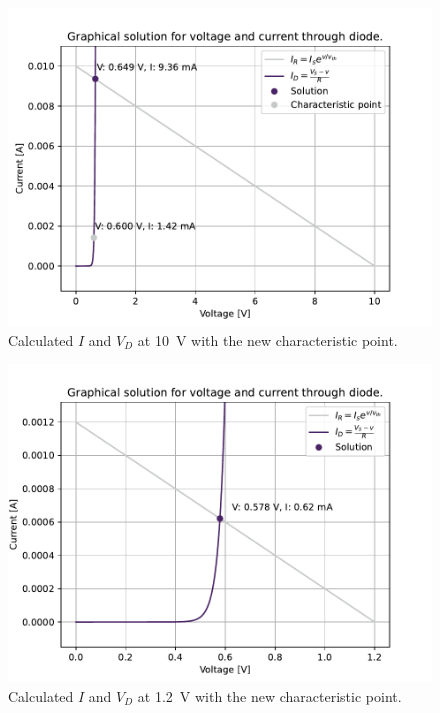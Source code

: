 \documentclass{../../ece-report}
\begin{document}
\begin{figure}[h!]
  \centering
  \includegraphics[width=0.7 \textwidth]{../plots/pdf/measured_diode_10V.pdf}
  \caption{Calculated $I$ and $V_D$ at 10~V with the new characteristic point.}
  \label{fig:measured_10V}
\end{figure}

\begin{figure}[h!]
  \centering
  \includegraphics[width=0.7 \textwidth]{../plots/pdf/measured_diode_1.2V.pdf}
  \caption{Calculated $I$ and $V_D$ at 1.2~V with the new characteristic point.}
  \label{fig:measured_1.2V}
\end{figure}
\end{document}
